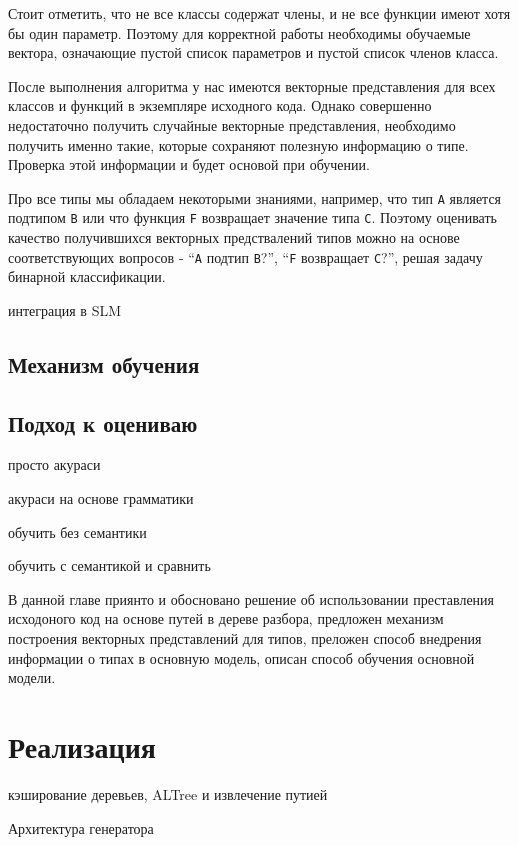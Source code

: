 \documentclass[times,specification,annotation]{itmo-student-thesis}
\begin{document}
Стоит отметить, что не все классы содержат члены, и не все функции имеют хотя бы один параметр. Поэтому для корректной работы необходимы обучаемые вектора, означающие пустой список параметров и пустой список членов класса.

После выполнения алгоритма у нас имеются векторные представления для всех классов и функций в экземпляре исходного кода. Однако совершенно недостаточно получить случайные векторные представления, необходимо получить именно такие, которые сохраняют полезную информацию о типе. Проверка этой информации и будет основой при обучении. 

Про все типы мы обладаем некоторыми знаниями, например, что тип \texttt{A} является подтипом \texttt{B} или что функция \texttt{F} возвращает значение типа \texttt{C}. Поэтому оценивать качество получившихся векторных предствалений типов можно на основе соответствующих вопросов - ``\texttt{A} подтип \texttt{B}?'', ``\texttt{F} возвращает \texttt{C}?'', решая задачу бинарной классификации.

интеграция в SLM

\section{Механизм обучения}\label{fit}

\section{Подход к оцениваю}\label{rate}
просто акураси

акураси на основе грамматики

обучить без семантики

обучить с семантикой и сравнить

\chapterconclusion

В данной главе приянто и обосновано решение об использовании преставления исходоного код на основе путей в дереве разбора, предложен механизм построения векторных представлений для типов, преложен способ внедрения информации о типах в основную модель, описан способ обучения основной модели.


\chapter{Реализация}

кэширование деревьев, ALTree и извлечение путией

Архитектура генератора
\end{document}
